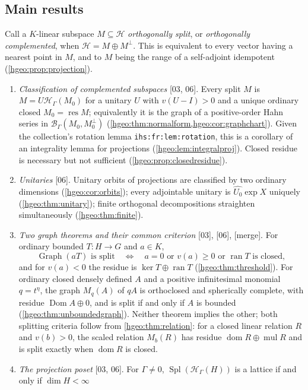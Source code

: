 \documentclass[11pt,letterpaper]{article}
\numberwithin{equation}{section}
\theoremstyle{definition}
\theoremstyle{remark}
\newcommand{\K}{K}
\newcommand{\HH}[1]{\mathscr H_\Gamma(#1)}
\newcommand{\BB}[2]{\mathscr B_\Gamma(#1,#2)}
\newcommand{\ran}{\operatorname{ran}}
\newcommand{\Dom}{\operatorname{Dom}}
\newcommand{\dom}{\operatorname{dom}}
\newcommand{\mul}{\operatorname{mul}}
\newcommand{\res}{\operatorname{res}}
\newcommand{\Graph}{\operatorname{Graph}}
\newcommand{\cH}{\mathcal H}
\newcommand{\Spl}{\operatorname{Spl}}
\newcommand{\src}[1]{\textup{\textsf{\small[#1]}}}
\newcommand{\mergetag}{\textup{\textsf{\small[merge]}}}
\newcommand{\replabel}[1]{\nolinkurl{#1}}
\begin{document}
\subsection{Main results}\label{hgeo:sub:results}
Call a $\K$-linear subspace $M\subseteq\cH$ \emph{orthogonally split}, or
\emph{orthogonally complemented}, when $\cH=M\oplus M^\perp$. This is
equivalent to every vector having a nearest point in $M$, and to $M$ being
the range of a self-adjoint idempotent (\cref{hgeo:prop:projection}).
\begin{enumerate}[label=\textup{(\arabic*)},leftmargin=2.2em]
\item \emph{Classification of complemented subspaces}
\src{03, 06}. Every split $M$ is $M=U\HH{M_0}$ for a unitary $U$ with
$v(U-I)>0$ and a unique ordinary closed $M_0=\res M$; equivalently it is the
graph of a positive-order Hahn series in $\BB{M_0}{M_0^\perp}$
(\cref{hgeo:thm:normalform,hgeo:cor:graphchart}). Given the collection's
rotation lemma \replabel{ihs:fr:lem:rotation}, this is a corollary of an
integrality lemma for projections (\cref{hgeo:lem:integralproj}). Closed
residue is necessary but not sufficient (\cref{hgeo:prop:closedresidue}).
\item \emph{Unitaries} \src{06}. Unitary orbits of projections are
classified by two ordinary dimensions (\cref{hgeo:cor:orbits}); every
adjointable unitary is $\widehat{U_0}\exp X$ uniquely
(\cref{hgeo:thm:unitary}); finite orthogonal decompositions straighten
simultaneously (\cref{hgeo:thm:finite}).
\item \emph{Two graph theorems and their common criterion} \src{03}, \src{06},
\mergetag. For ordinary bounded $T:H\to G$ and $a\in\K$,
\[
 \Graph(aT)\text{ is split}
 \quad\Longleftrightarrow\quad
 a=0\text{ or }v(a)\ge0\text{ or }\ran T\text{ is closed},
\]
and for $v(a)<0$ the residue is $\ker T\oplus\ran T$
(\cref{hgeo:thm:threshold}). For ordinary closed densely defined
$A$ and a positive infinitesimal monomial $q=t^\eta$, the graph $M_q(A)$ of
$qA$ is orthoclosed and spherically
complete, with residue $\Dom A\oplus0$, and is split if and only if $A$ is
bounded (\cref{hgeo:thm:unboundedgraph}). Neither theorem implies the other;
both splitting criteria follow from \cref{hgeo:thm:relation}: for a closed
linear relation $R$ and $v(b)>0$, the scaled relation $M_b(R)$ has residue
$\dom R\oplus\mul R$ and is split exactly when $\dom R$ is closed.
\item \emph{The projection poset} \src{03, 06}. For $\Gamma\ne0$,
$\Spl(\HH{H})$ is a lattice if and only if $\dim H<\infty$

\end{enumerate}
\end{document}
